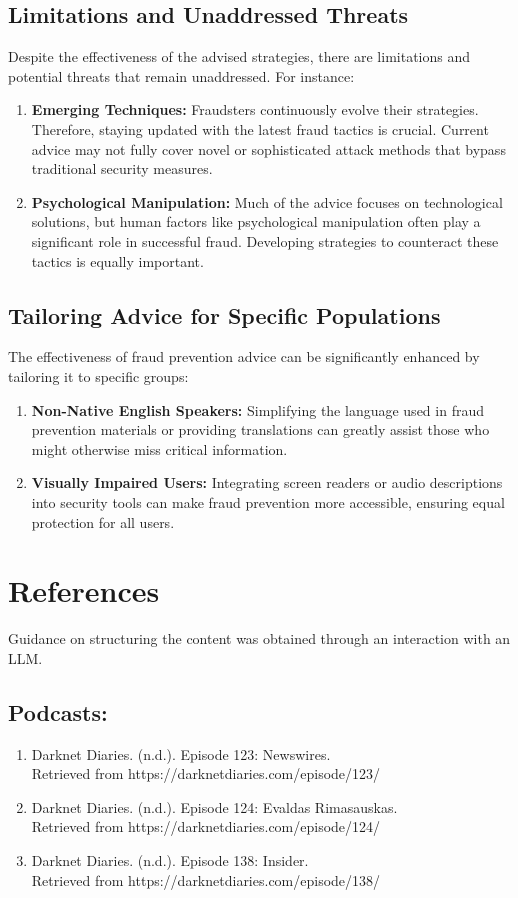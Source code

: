\documentclass[11pt]{article}
\begin{document}
\subsection{Limitations and Unaddressed Threats}
Despite the effectiveness of the advised strategies, there are limitations and potential threats that remain unaddressed. For instance:
\begin{enumerate}
    \item \textbf{Emerging Techniques:} Fraudsters continuously evolve their strategies. Therefore, staying updated with the latest fraud tactics is crucial. Current advice may not fully cover novel or sophisticated attack methods that bypass traditional security measures.
    \item \textbf{Psychological Manipulation:} Much of the advice focuses on technological solutions, but human factors like psychological manipulation often play a significant role in successful fraud. Developing strategies to counteract these tactics is equally important.
\end{enumerate}

\subsection{Tailoring Advice for Specific Populations}
The effectiveness of fraud prevention advice can be significantly enhanced by tailoring it to specific groups:
\begin{enumerate}
    \item \textbf{Non-Native English Speakers:} Simplifying the language used in fraud prevention materials or providing translations can greatly assist those who might otherwise miss critical information.
    \item \textbf{Visually Impaired Users:} Integrating screen readers or audio descriptions into security tools can make fraud prevention more accessible, ensuring equal protection for all users.
\end{enumerate}


\newpage
\section{References}
Guidance on structuring the content was obtained through an interaction with an LLM.
\subsection*{Podcasts:}
\begin{enumerate}
    \item Darknet Diaries. (n.d.). Episode 123: Newswires. \\
    Retrieved from https://darknetdiaries.com/episode/123/
    \item Darknet Diaries. (n.d.). Episode 124: Evaldas Rimasauskas. \\
    Retrieved from https://darknetdiaries.com/episode/124/
    \item Darknet Diaries. (n.d.). Episode 138: Insider. \\
    Retrieved from https://darknetdiaries.com/episode/138/
\end{enumerate}
\end{document}
